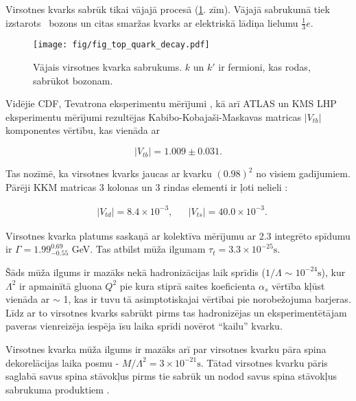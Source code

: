 Virsotnes kvarks sabrūk tikai vājajā procesā (\ref{fig:quark_decay}. zīm). Vājajā sabrukumā tiek izstarots \PW\ bozons un citas \gls{smaržas} kvarks ar elektriskā lādiņa lielumu  $\frac{1}{3}e$. 

\begin{figure}[H]
  \centering
  \texttt{[image: fig/fig\_top\_quark\_decay.pdf]}
  \caption{Vājais virsotnes kvarka \cPqt sabrukums. $k$ un $k'$ ir fermioni, kas rodas, sabrūkot \PW bozonam.}
  \label{fig:quark_decay}
\end{figure}

Vidējie CDF, \DZERO Tevatrona eksperimentu mērījumi \cite{Aaltonen:2015cra}, kā arī ATLAS un KMS LHP eksperimentu mērījumi \cite{twiki:tt_curve_toplhcwg_sep18} rezultējas Kabibo-Kobajaši-Maskavas matricas $|V_{tb}|$ komponentes vērtību, kas vienāda ar

\begin{equation}
  |V_{tb}|=1.009\pm0.031.
\end{equation}

Tas nozīmē, ka virsotnes kvarks jaucas ar \cPqb kvarku $(0.98)^{2}$ no visiem gadījumiem. Pārēji KKM matricas 3 kolonas un 3 rindas elementi ir ļoti nelieli \cite{Patrignani:2016xqp}:

\begin{align}
  & |V_{td}|=8.4\times10^{-3}, && |V_{ts}|=40.0\times10^{-3}.
\end{align}

Virsotnes kvarka platums saskaņā ar \DZERO kolektīva mērījumu \cite{Abazov:2010tm} ar 2.3 \fbinv integrēto spīdumu ir $\Gamma=1.99^{0.69}_{-0.55}$ GeV. Tas atbilst mūža ilgumam $\tau_{t}=3.3\times10^{-25}\text{s}$.

Šāds mūža ilgums ir mazāks nekā hadronizācijas laik sprīdis ($1/\Lambda$ $\sim$ $10^{-24}\text{s}$), kur $\Lambda^{2}$ ir apmainītā gluona $Q^{2}$ pie kura stiprā saites koeficienta $\alpha_{s}$ vērtība kļūst vienāda ar $\sim$ 1, kas ir tuvu tā asimptotiskajai vērtībai pie \gls{norobežojuma barjeras}. Līdz ar to virsotnes kvarks sabrūkt pirms tas hadronizējas un eksperimentētājam paveras vienreizēja iespēja īsu laika sprīdi novērot ``kailu'' kvarku.

Virsotnes kvarka mūža ilgums ir mazāks arī par virsotnes kvarku pāra spina dekorelācijas laika posmu - $M/{\Lambda^{2}}=3\times 10^{-21}\text{s}$. Tātad virsotnes kvarku pāris saglabā savus spina stāvokļus pirms tie sabrūk un nodod savus spina stāvokļus sabrukuma produktiem \cite{Cristinziani:2016vif}.

